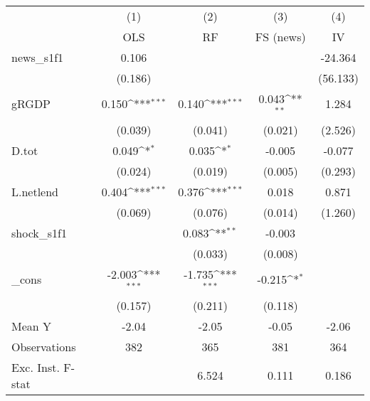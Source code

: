 {
\def\sym#1{\ifmmode^{#1}\else\(^{#1}\)\fi}
\begin{tabular}{l*{4}{c}}
\toprule
            &\multicolumn{1}{c}{(1)}&\multicolumn{1}{c}{(2)}&\multicolumn{1}{c}{(3)}&\multicolumn{1}{c}{(4)}\\
            &\multicolumn{1}{c}{OLS}&\multicolumn{1}{c}{RF}&\multicolumn{1}{c}{FS (news)}&\multicolumn{1}{c}{IV}\\
\midrule
news\_s1f1   &       0.106         &                     &                     &     -24.364         \\
            &     (0.186)         &                     &                     &    (56.133)         \\
\addlinespace
gRGDP       &       0.150\sym{***}&       0.140\sym{***}&       0.043\sym{**} &       1.284         \\
            &     (0.039)         &     (0.041)         &     (0.021)         &     (2.526)         \\
\addlinespace
D.tot       &       0.049\sym{*}  &       0.035\sym{*}  &      -0.005         &      -0.077         \\
            &     (0.024)         &     (0.019)         &     (0.005)         &     (0.293)         \\
\addlinespace
L.netlend   &       0.404\sym{***}&       0.376\sym{***}&       0.018         &       0.871         \\
            &     (0.069)         &     (0.076)         &     (0.014)         &     (1.260)         \\
\addlinespace
shock\_s1f1  &                     &       0.083\sym{**} &      -0.003         &                     \\
            &                     &     (0.033)         &     (0.008)         &                     \\
\addlinespace
\_cons      &      -2.003\sym{***}&      -1.735\sym{***}&      -0.215\sym{*}  &                     \\
            &     (0.157)         &     (0.211)         &     (0.118)         &                     \\
\midrule
Mean Y      &       -2.04         &       -2.05         &       -0.05         &       -2.06         \\
Observations&         382         &         365         &         381         &         364         \\
Exc. Inst. F-stat&                     &       6.524         &       0.111         &       0.186         \\
\bottomrule
\end{tabular}
}
